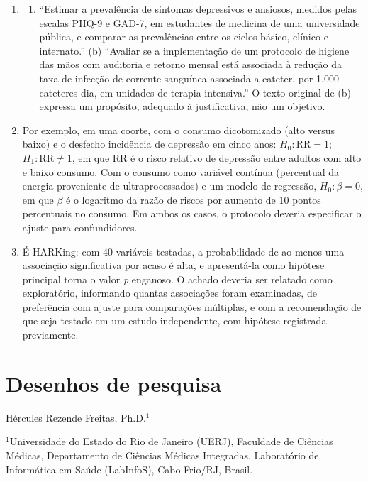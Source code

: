 \documentclass[
]{book}
\providecommand{\tightlist}{%
  \setlength{\itemsep}{0pt}\setlength{\parskip}{0pt}}
\begin{document}
\begin{enumerate}
  A estratégia deveria ser complementada com buscas em outras bases (Embase, LILACS, Cochrane Library) e registrada com a data.
\item
  \begin{enumerate}
  \def\labelenumii{(\alph{enumii})}
  \tightlist
  \item
    ``Estimar a prevalência de sintomas depressivos e ansiosos, medidos pelas escalas PHQ-9 e GAD-7, em estudantes de medicina de uma universidade pública, e comparar as prevalências entre os ciclos básico, clínico e internato.'' (b) ``Avaliar se a implementação de um protocolo de higiene das mãos com auditoria e retorno mensal está associada à redução da taxa de infecção de corrente sanguínea associada a cateter, por 1.000 cateteres-dia, em unidades de terapia intensiva.'' O texto original de (b) expressa um propósito, adequado à justificativa, não um objetivo.
  \end{enumerate}
\item
  Por exemplo, em uma coorte, com o consumo dicotomizado (alto versus baixo) e o desfecho incidência de depressão em cinco anos: \(H_0\colon \text{RR} = 1\); \(H_1\colon \text{RR} \neq 1\), em que RR é o risco relativo de depressão entre adultos com alto e baixo consumo. Com o consumo como variável contínua (percentual da energia proveniente de ultraprocessados) e um modelo de regressão, \(H_0\colon \beta = 0\), em que \(\beta\) é o logaritmo da razão de riscos por aumento de 10 pontos percentuais no consumo. Em ambos os casos, o protocolo deveria especificar o ajuste para confundidores.
\item
  É HARKing: com 40 variáveis testadas, a probabilidade de ao menos uma associação significativa por acaso é alta, e apresentá-la como hipótese principal torna o valor \emph{p} enganoso. O achado deveria ser relatado como exploratório, informando quantas associações foram examinadas, de preferência com ajuste para comparações múltiplas, e com a recomendação de que seja testado em um estudo independente, com hipótese registrada previamente.
\end{enumerate}

\chapter{Desenhos de pesquisa}\label{desenhos-de-pesquisa}

Hércules Rezende Freitas, Ph.D.\(^1\)

\(^1\)Universidade do Estado do Rio de Janeiro (UERJ), Faculdade de Ciências Médicas, Departamento de Ciências Médicas Integradas, Laboratório de Informática em Saúde (LabInfoS), Cabo Frio/RJ, Brasil.
\end{document}
